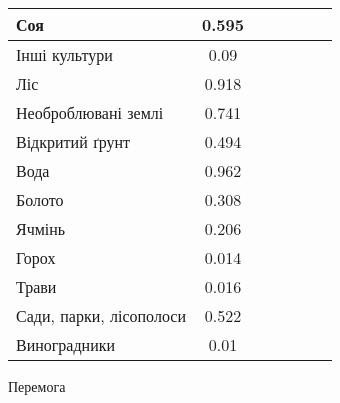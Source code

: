 \begin{table}[!ht]
\begin{tabular}{|K|S|C|C|S|C|C|}
        \hline Соя                           & 0.595                                     &                                           &              &  &         &              \\
        \hline Інші культури                 & 0.09                                      &                                           &              &  &         &              \\
        \hline Ліс                           & 0.918                                     &                                           &              &  &         &              \\
        \hline Необроблювані землі           & 0.741                                     &                                           &              &  &         &              \\
        \hline Відкритий ґрунт               & 0.494                                     &                                           &              &  &         &              \\
        \hline Вода                          & 0.962                                     &                                           &              &  &         &              \\
        \hline Болото                        & 0.308                                     &                                           &              &  &         &              \\
        \hline Ячмінь                        & 0.206                                     &                                           &              &  &         &              \\
        \hline Горох                         & 0.014                                     &                                           &              &  &         &              \\
        \hline Трави                         & 0.016                                     &                                           &              &  &         &              \\
        \hline Сади, парки, лісополоси       & 0.522                                     &                                           &              &  &         &              \\
        \hline Виноградники                  & 0.01                                      &                                           &              &  &         &              \\
        \hline
    \end{tabular}
    \label{tab:segm_result_augm_per_classes}
\end{table}

\chapconclude{\ref{chap:practice}}
Перемога
